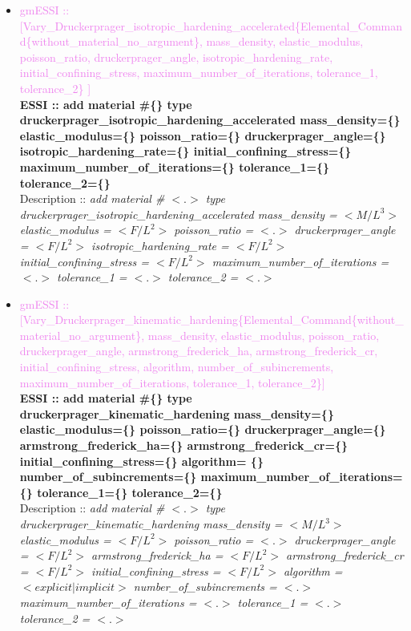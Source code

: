 \documentclass[11pt]{article}
\begin{document}
\begin{itemize}
    \item \textcolor{violet}{gmESSI :: [Vary\_Druckerprager\_isotropic\_hardening\_accelerated\{Elemental\_Command\{without\_material\_no\_argument\}, mass\_density, elastic\_modulus, poisson\_ratio, druckerprager\_angle, isotropic\_hardening\_rate, initial\_confining\_stress, maximum\_number\_of\_iterations, tolerance\_1, tolerance\_2\} ]}\\
    \textbf{ESSI :: add material \#\{\} type druckerprager\_isotropic\_hardening\_accelerated mass\_density=\{\} elastic\_modulus=\{\}  poisson\_ratio=\{\} druckerprager\_angle=\{\} isotropic\_hardening\_rate=\{\} initial\_confining\_stress=\{\} maximum\_number\_of\_iterations=\{\} tolerance\_1=\{\} tolerance\_2=\{\}}\\
    Description ::  \textit{ add material \# $<.>$ type druckerprager\_isotropic\_hardening\_accelerated mass\_density = $<M/L^3>$ elastic\_modulus = $<F/L^2>$  poisson\_ratio = $<.>$ druckerprager\_angle = $<F/L^2>$ isotropic\_hardening\_rate = $<F/L^2>$ initial\_confining\_stress = $<F/L^2>$ maximum\_number\_of\_iterations = $<.>$ tolerance\_1 = $<.>$ tolerance\_2 = $<.>$} 

    \item \textcolor{violet}{gmESSI :: [Vary\_Druckerprager\_kinematic\_hardening\{Elemental\_Command\{without\_material\_no\_argument\}, mass\_density, elastic\_modulus, poisson\_ratio, druckerprager\_angle, armstrong\_frederick\_ha, armstrong\_frederick\_cr, initial\_confining\_stress, algorithm, number\_of\_subincrements, maximum\_number\_of\_iterations, tolerance\_1, tolerance\_2\}]}\\
    \textbf{ESSI :: add material \#\{\} type druckerprager\_kinematic\_hardening mass\_density=\{\} elastic\_modulus=\{\}  poisson\_ratio=\{\} druckerprager\_angle=\{\} armstrong\_frederick\_ha=\{\} armstrong\_frederick\_cr=\{\} initial\_confining\_stress=\{\} algorithm= \{\}  number\_of\_subincrements=\{\} maximum\_number\_of\_iterations=\{\} tolerance\_1=\{\} tolerance\_2=\{\}}\\
    Description ::  \textit{ add material \# $<.>$ type druckerprager\_kinematic\_hardening  mass\_density = $<M/L^3>$ elastic\_modulus = $<F/L^2>$  poisson\_ratio = $<.>$ druckerprager\_angle = $<F/L^2>$ armstrong\_frederick\_ha = $<F/L^2>$ armstrong\_frederick\_cr = $<F/L^2>$ initial\_confining\_stress = $<F/L^2>$ algorithm = $<explicit|implicit>$  number\_of\_subincrements = $<.>$ maximum\_number\_of\_iterations = $<.>$ tolerance\_1 = $<.>$ tolerance\_2 = $<.>$} 


\end{itemize}
\end{document}
